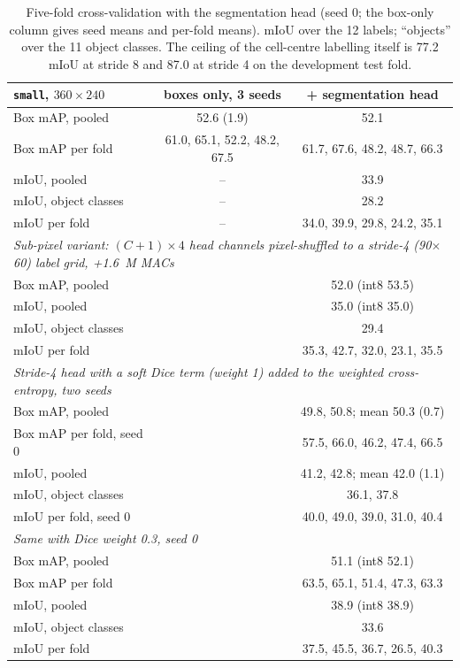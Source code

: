 \documentclass[11pt,a4paper]{article}
\newcommand{\cfg}[1]{\texttt{#1}}
\begin{document}
\begin{table}[h]
  \centering
  \small
  \begin{tabular}{lcc}
    \toprule
    \cfg{small}, $360 \times 240$ & boxes only, 3 seeds & + segmentation head \\
    \midrule
    Box mAP, pooled & 52.6 (1.9) & 52.1 \\
    Box mAP per fold & 61.0, 65.1, 52.2, 48.2, 67.5 & 61.7, 67.6, 48.2, 48.7, 66.3 \\
    mIoU, pooled & -- & 33.9 \\
    mIoU, object classes & -- & 28.2 \\
    mIoU per fold & -- & 34.0, 39.9, 29.8, 24.2, 35.1 \\
    \midrule
    \multicolumn{3}{l}{\emph{Sub-pixel variant: $(C+1) \times 4$ head channels pixel-shuffled to a stride-4 (90$\times$60) label grid, +1.6~M MACs}} \\
    Box mAP, pooled & & 52.0 (int8 53.5) \\
    mIoU, pooled & & 35.0 (int8 35.0) \\
    mIoU, object classes & & 29.4 \\
    mIoU per fold & & 35.3, 42.7, 32.0, 23.1, 35.5 \\
    \midrule
    \multicolumn{3}{l}{\emph{Stride-4 head with a soft Dice term (weight 1) added to the weighted cross-entropy, two seeds}} \\
    Box mAP, pooled & & 49.8, 50.8; mean 50.3 (0.7) \\
    Box mAP per fold, seed 0 & & 57.5, 66.0, 46.2, 47.4, 66.5 \\
    mIoU, pooled & & 41.2, 42.8; mean 42.0 (1.1) \\
    mIoU, object classes & & 36.1, 37.8 \\
    mIoU per fold, seed 0 & & 40.0, 49.0, 39.0, 31.0, 40.4 \\
    \midrule
    \multicolumn{3}{l}{\emph{Same with Dice weight 0.3, seed 0}} \\
    Box mAP, pooled & & 51.1 (int8 52.1) \\
    Box mAP per fold & & 63.5, 65.1, 51.4, 47.3, 63.3 \\
    mIoU, pooled & & 38.9 (int8 38.9) \\
    mIoU, object classes & & 33.6 \\
    mIoU per fold & & 37.5, 45.5, 36.7, 26.5, 40.3 \\
    \bottomrule
  \end{tabular}
  \caption{Five-fold cross-validation with the segmentation head (seed 0;
  the box-only column gives seed means and per-fold means). mIoU over the 12
  labels; ``objects'' over the 11 object classes. The ceiling of the
  cell-centre labelling itself is 77.2 mIoU at stride 8 and 87.0 at stride
  4 on the development test fold.}
  \label{tab:seg}
\end{table}
\end{document}
